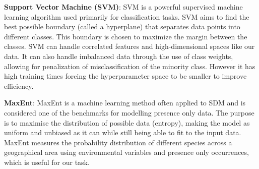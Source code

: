 \documentclass{article}
\begin{document}
\textbf{Support Vector Machine (SVM)}: SVM is a powerful supervised machine learning algorithm used primarily for classification tasks. SVM aims to find the best possible boundary (called a hyperplane) that separates data points into different classes. This boundary is chosen to maximize the margin between the classes.  SVM can handle correlated features and high-dimensional spaces like our data. It can also handle imbalanced data through the use of class weights, allowing for penalization of misclassification of the minority class.  However it has high training times forcing the hyperparameter space to be smaller to improve efficiency. 


\textbf{MaxEnt}: MaxEnt is a machine learning method often applied to SDM and is considered one of the benchmarks for modelling presence only data. The purpose is to maximise the distribution of possible data (entropy), making the model as uniform and unbiased as it can while still being able to fit to the input data. MaxEnt measures the probability distribution of different species across a geographical area using environmental variables and presence only occurrences, which is useful for our task.
\end{document}
